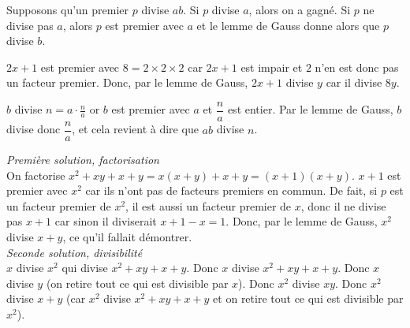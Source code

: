 \begin{sol}
Supposons qu'un premier $p$ divise $ab$. Si $p$ divise $a$, alors on a gagné. Si $p$ ne divise pas $a$, alors $p$ est premier avec $a$ et le lemme de Gauss donne alors que $p$ divise $b$.
\end{sol}


\begin{sol}
$2x+1$ est premier avec $8 = 2 \times 2 \times 2$ car $2x+1$ est impair et $2$ n'en est donc pas un facteur premier. Donc, par le lemme de Gauss, $2x+1$ divise $y$ car il divise $8y$.
\end{sol}


\begin{sol}
$b$ divise $n = a \cdot \frac n a$ or $b$ est premier avec $a$ et $\dfrac n a$ est entier. Par le lemme de Gauss, $b$ divise donc $\dfrac n a$, et cela revient à dire que $ab$ divise $n$.
\end{sol}


\begin{sol}
\textit{Première solution, factorisation} \\
On factorise $x^2 + xy + x + y = x\left(x+y\right) + x+y = (x + 1)(x + y)$. $x+1$ est premier avec $x^2$ car ils n'ont pas de facteurs premiers en commun. De fait, si $p$ est un facteur premier de $x^2$, il est aussi un facteur premier de $x$, donc il ne divise pas $x+1$ car sinon il diviserait $x+1-x=1$. Donc, par le lemme de Gauss, $x^2$ divise $x+y$, ce qu'il fallait démontrer. \\
\textit{Seconde solution, divisibilité} \\
$x$ divise $x^2$ qui divise $x^2 + xy + x + y$. Donc $x$ divise $x^2 + xy + x + y$. Donc $x$ divise $y$ (on retire tout ce qui est divisible par $x$). Donc $x^2$ divise $xy$. Donc $x^2$ divise $x + y$ (car $x^2$ divise $x^2 + xy + x + y$ et on retire tout ce qui est divisible par $x^2$).
\end{sol}